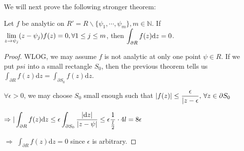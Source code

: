  We will next prove the following stronger theorem:
 \begin{theorem}\label{stronger version of Cauchy's theorem for a rectangle}
    Let  $ f $ be analytic on  $ R'=R\backslash\{\psi_1,\cdots,\psi_m\}, m\in \mathbb{N} $. If  $ \displaystyle\lim\limits_{z\to\psi_j}(z-\psi_j)f(z)=0,\forall 1 \leq j \leq m $, then  $ \displaystyle\int_{\partial R}f(z)\mathrm{d}z=0 $.    
 \end{theorem}
 \begin{proof}
    WLOG, we may assume  $ f $ is not analytic at only one point  $ \psi\in R $. If we put  $ psi  $ into a small rectangle $ S_0 $, then the previous theorem tells us  $ \int_{
        \partial R
    }f(z)\mathrm{d}z=\int_{\partial S_0}f(z)\mathrm{d}z $.
    
     $ \forall \epsilon>0 $, we may choose  $ S_0 $ small enough such that  $ |f(z)| \leq \displaystyle\frac{\epsilon}{|z-\epsilon},\,\forall z\in\partial S_0 $
     
      $\displaystyle \Rightarrow|\int_{\partial R}f(z)\mathrm{d}z \leq \epsilon \int_{\partial S_0}\frac{|\mathrm{d}z|}{|z-\psi|} \leq \epsilon \frac{1}{\frac{l}{2}}\cdot 4l=8\epsilon $ 
      
       $ \Rightarrow $ $ \int_{\partial R}f(z)\mathrm{d}z=0 $ since  $ \epsilon $ is arbitrary.   
 \end{proof}
